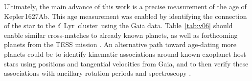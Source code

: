 \documentclass[12pt,modern,twocolumn,tighten]{aastex63}
\newcommand{\cn}{$\delta$\ Lyr\ cluster} %
\newcommand{\pn}{Kepler\,1627Ab} %
\begin{document}
Ultimately, the main advance of this work is a precise measurement of
the age of \pn.   This age measurement was enabled by identifying the
connection of the star to the \cn\ using the Gaia data.
Table~\ref{tab:v06} should enable similar cross-matches to already
known planets, as well as forthcoming planets from the TESS mission
\citep{ricker_transiting_2015,guerrero_tess_2021}.  An alternative
path toward age-dating more planets could be to identify kinematic
associations around known exoplanet host stars using positions and
tangential velocities from Gaia, and to then verify these associations
with ancillary rotation periods and spectroscopy \citep[{\it
e.g.},][]{tofflemire_tess_2021}.




\acknowledgements
\raggedbottom
\end{document}
